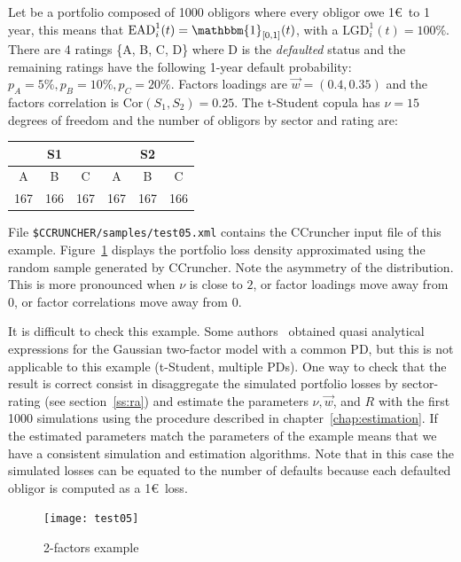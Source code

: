 \documentclass[11pt,fleqn]{book} %
\begin{document}
\begin{example}[2 factors]
	\label{ex:test05}
	Let be a portfolio composed of 1000 obligors where every obligor owe 1\euro\ to
	1 year, this means that $\text{EAD}_i^1(t) = \mathbbm{1}_{[0,1]}(t)$, with 
	a $\text{LGD}_i^1(t)=100\%$. There are 4 ratings \{A, B, C, D\} where D is the 
	\emph{defaulted} status and the remaining ratings have the following 1-year 
	default probability: $p_A = 5\%, p_B = 10\%, p_C = 20\%$. Factors loadings 
	are $\vec{w} = (0.4, 0.35)$ and the factors correlation is 
	$\text{Cor}(S_1,S_2) = 0.25$. The t-Student copula has $\nu=15$ degrees
	of freedom and the number of obligors by sector and rating are:

	\hspace*{1cm}
	\begin{tabular}{|c|c|c||c|c|c|}
		\hline
		\multicolumn{3}{|c||}{S1} & \multicolumn{3}{|c|}{S2} \\
		\hline
		A & B & C & A & B & C \\
		\hline
		167 & 166 & 167 & 167 & 167 & 166 \\
		\hline
	\end{tabular}

	File \texttt{\$CCRUNCHER/samples/test05.xml} contains the CCruncher input
	file of this example. Figure~\ref{fig:test05} displays the portfolio
	loss density approximated using the random sample generated by CCruncher.
	Note the asymmetry of the distribution. This is more pronounced when 
	$\nu$ is close to $2$, or factor loadings move away from $0$, or factor 
	correlations move away from $0$.

	It is difficult to check this example. Some authors~\cite{cespedes:2002}
	obtained quasi analytical expressions for the Gaussian two-factor model 
	with a common PD, but this is not applicable to this example (t-Student, 
	multiple PDs).
	One way to check that the result is correct consist in disaggregate the
	simulated portfolio losses by sector-rating (see section~\ref{ss:ra}) and 
	estimate the parameters $\nu, \vec{w}$, and $R$ with the first 1000 
	simulations using the procedure described in chapter~\ref{chap:estimation}. 
	If the estimated parameters match the parameters of the example means that 
	we have a consistent simulation and estimation algorithms. Note that in 
	this case the simulated losses can be equated to the number of defaults 
	because each defaulted obligor is computed as a 1\euro\ loss.
	\begin{figure}[ht]
		\centering
		\texttt{[image: test05]}
		\caption{2-factors example}
		\label{fig:test05}
	\end{figure}
\end{example}
\end{document}
